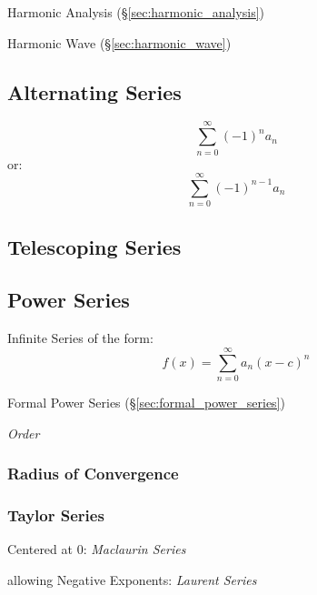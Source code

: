 \fist Harmonic Analysis (\S\ref{sec:harmonic_analysis})

\fist Harmonic Wave (\S\ref{sec:harmonic_wave})



\subsection{Alternating Series}\label{sec:alternating_series}

\[
  \sum_{n=0}^\infty (-1)^n a_n
\]
or:
\[
  \sum_{n=0}^\infty (-1)^{n-1} a_n
\]



\subsection{Telescoping Series}\label{sec:telescoping_series}

\subsection{Power Series}\label{sec:power_series}

Infinite Series of the form:
\[
  f(x) = \sum_{n=0}^\infty a_n (x - c)^n
\]

\fist Formal Power Series (\S\ref{sec:formal_power_series})

\emph{Order}



\subsubsection{Radius of Convergence}\label{sec:radius_of_convergence}

\subsubsection{Taylor Series}\label{sec:taylor_series}

Centered at $0$: \emph{Maclaurin Series}

allowing Negative Exponents: \emph{Laurent Series}

